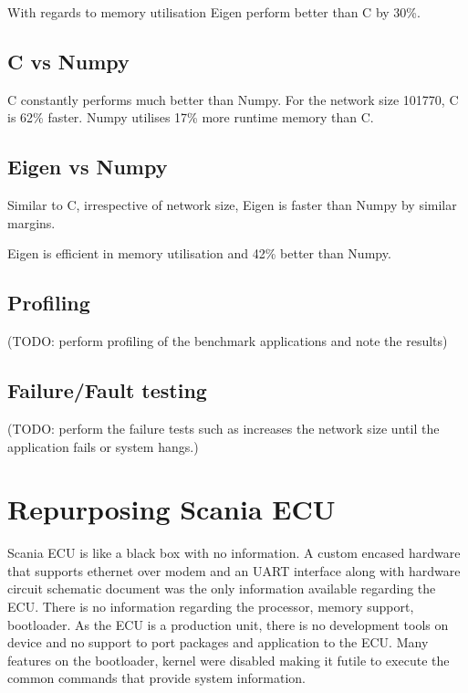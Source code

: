 With regards to memory utilisation Eigen perform better than C by 30\%. 

\subsection{C vs Numpy}
C constantly performs much better than Numpy. For the network size 101770, C is 62\% faster. 
Numpy utilises 17\% more runtime memory than C.

\subsection{Eigen vs Numpy}
Similar to C, irrespective of network size, Eigen is faster than Numpy by similar margins. 

Eigen is efficient in memory utilisation and 42\% better than Numpy.

\subsection{Profiling}
(TODO: perform profiling of the benchmark applications and note the results)

\subsection{Failure/Fault testing}
(TODO: perform the failure tests such as increases the network size until the application fails or system hangs.)

\section{Repurposing Scania ECU}
Scania ECU is like a black box with no information. A custom encased hardware that supports ethernet over modem and an UART interface along with hardware circuit schematic document was the only information available regarding the ECU. There is no information regarding the processor,  memory support, bootloader. As the ECU is a production unit, there is no development tools on device and no support to port packages and application to the ECU. Many features on the bootloader, kernel were disabled making it futile to execute the common commands that provide system information.

